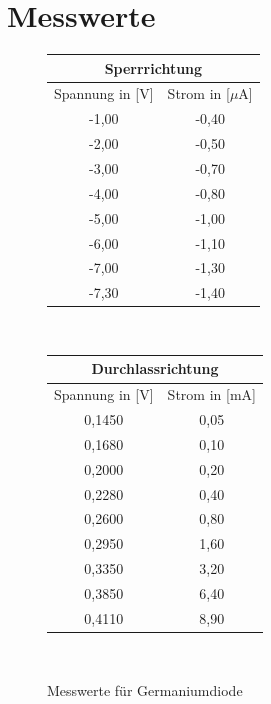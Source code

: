 \documentclass[fontsize=12pt]{scrartcl}
\begin{document}
\newpage

\section{ Messwerte}
\begin{figure}[H]
\caption{Messwerte für Germaniumdiode}
\begin{minipage}{0.5\textwidth}
\vspace{-15pt}
\centering
\begin{tabular}{|c|c|} \hline
\multicolumn{2}{|c|}{ Sperrrichtung	}\\ \hline
Spannung in [V]	& Strom in  [$\mu$A] \\ \hline
-1,00	&-0,40\\ \hline
-2,00	&-0,50\\ \hline
-3,00	&-0,70\\ \hline
-4,00	&-0,80\\ \hline
-5,00	&-1,00\\ \hline
-6,00	&-1,10\\ \hline
-7,00	&-1,30\\ \hline
-7,30	&-1,40\\ \hline
\end{tabular} \\
\end{minipage}
\begin{minipage}{0.2\textwidth}
\centering
\begin{tabular}{|c|c|} \hline
\multicolumn{2}{|c|}{ Durchlassrichtung}	\\ \hline
Spannung in [V]	& Strom in  [mA] \\ \hline
0,1450	&0,05\\ \hline
0,1680	&0,10\\ \hline
0,2000	&0,20\\ \hline
0,2280	&0,40\\ \hline
0,2600	&0,80\\ \hline
0,2950	&1,60\\ \hline
0,3350	&3,20\\ \hline
0,3850	&6,40\\ \hline
0,4110	&8,90\\ \hline
\end{tabular} \\
\end{minipage}
\end{figure}
\vspace{-20pt}
\end{document}
